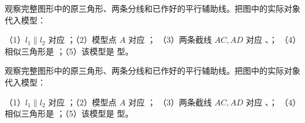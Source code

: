 \documentclass{exam-zh}
\begin{document}
\begin{problem}[points=10]
  \noindent
  \begin{minipage}[t]{\dimexpr\linewidth-60mm-6mm\relax}
    \vspace{0pt}
    观察完整图形中的原三角形、两条分线和已作好的平行辅助线。把图中的实际对象代入模型：

（1）$l_1\parallel l_2$ 对应 \underline{\hspace{2cm}}；（2）模型点 $A$ 对应 \underline{\hspace{1cm}}；
（3）两条截线 $AC,AD$ 对应 \underline{\hspace{1.5cm}}、\underline{\hspace{1.5cm}}；
（4）相似三角形是 \underline{\hspace{4cm}}；（5）该模型是 \underline{\hspace{1.5cm}} 型。


  \end{minipage}\hfill
  \begin{diagramcoltikz}{60mm}{第 2 题图}
  }
  \end{diagramcoltikz}
  \par\medskip
  \answerarea[32mm]
\end{problem}



\begin{problem}[points=10]
  \noindent
  \begin{minipage}[t]{\dimexpr\linewidth-60mm-6mm\relax}
    \vspace{0pt}
    观察完整图形中的原三角形、两条分线和已作好的平行辅助线。把图中的实际对象代入模型：

（1）$l_1\parallel l_2$ 对应 \underline{\hspace{2cm}}；（2）模型点 $A$ 对应 \underline{\hspace{1cm}}；
（3）两条截线 $AC,AD$ 对应 \underline{\hspace{1.5cm}}、\underline{\hspace{1.5cm}}；
（4）相似三角形是 \underline{\hspace{4cm}}；（5）该模型是 \underline{\hspace{1.5cm}} 型。


  \end{minipage}\hfill
  \begin{diagramcoltikz}{60mm}{第 3 题图}
  }
  \end{diagramcoltikz}
  \par\medskip
  \answerarea[32mm]
\end{problem}
\end{document}
